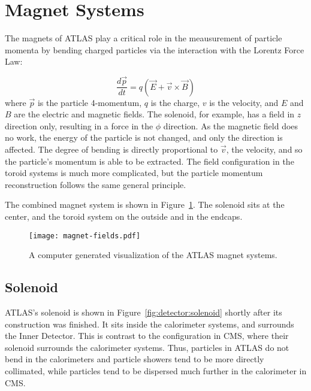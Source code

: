 




\section{Magnet Systems}

The magnets of ATLAS play a critical role in the meausurement of particle momenta by bending charged particles via the interaction with the Lorentz Force Law:

\begin{equation}
\frac{d \vec{p}}{d t} = q (\vec{E} + \vec{v} \times \vec{B})
\end{equation}
%
where $\vec{p}$ is the particle 4-momentum, $q$ is the charge, $v$ is the velocity, and $E$ and $B$ are the electric and magnetic fields. The solenoid, for example, has a field in $z$ direction only, resulting in a force in the $\phi$ direction. As the magnetic field does no work, the energy of the particle is not changed, and only the direction is affected. The degree of bending is directly proportional to $\vec{v}$, the velocity, and so the particle's momentum is able to be extracted. The field configuration in the toroid systems is much more complicated, but the particle momentum reconstruction follows the same general principle. 

The combined magnet system is shown in Figure~\ref{fig:detector:magnets}. The solenoid sits at the center, and the toroid system on the outside and in the endcaps.


\begin{figure}
\centering
\texttt{[image: magnet-fields.pdf]}
\label{fig:detector:magnets}
\caption{A computer generated visualization of the ATLAS magnet systems.}
\end{figure}



\subsection{Solenoid}
\label{atlas:magnets:solenoid}

ATLAS's solenoid is shown in Figure~\ref{fig:detector:solenoid} shortly after its construction was finished. It sits inside the calorimeter systems, and surrounds the Inner Detector. This is contrast to the configuration in CMS, where their solenoid surrounds the calorimeter systems. Thus, particles in ATLAS do not bend in the calorimeters and particle showers tend to be more directly collimated, while particles tend to be dispersed much further in the calorimeter in CMS.

